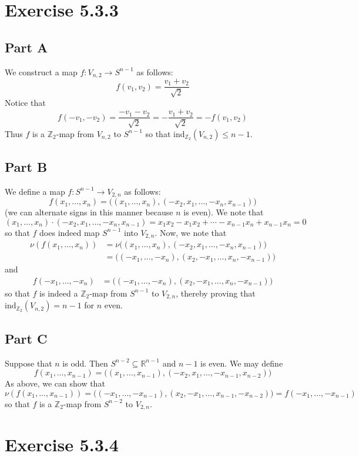 \documentclass[12pt]{article}
\newcommand{\rr}{{\mathbb R}}
\newcommand{\zz}{\mathbb Z}
\begin{document}
\section*{Exercise 5.3.3}
\subsection*{Part A}
We construct a map $f: V_{n,2} \rightarrow S^{n-1}$ as follows:
\[
f(v_1,v_2) = \frac{v_1 + v_2}{\sqrt{2}}
\] Notice that
\[
f(-v_1,-v_2) = \frac{-v_1 -v_2}{\sqrt{2}} = -\frac{v_1+v_2}{\sqrt{2}} = -f(v_1,v_2)
\] Thus $f$ is a $\zz_2$-map from $V_{n,2}$ to $S^{n-1}$ so that $\text{ind}_{\zz_2}(V_{n,2}) \leq n - 1$.
\newpage
\subsection*{Part B}
We define a map $f: S^{n-1} \rightarrow V_{2,n}$ as follows:
\[
f(x_1,\ldots,x_n) = \big((x_1,\ldots,x_n),(-x_2,x_1,\ldots,-x_n,x_{n-1})\big)
\] (we can alternate signs in this manner because $n$ is even). We note that
\[
(x_1,\ldots,x_n) \cdot (-x_2,x_1,\ldots,-x_n,x_{n-1}) = x_1x_2 - x_1x_2 + \cdots - x_{n-1}x_n + x_{n-1}x_n = 0
\] so that $f$ does indeed map $S^{n-1}$ into $V_{2,n}$. Now, we note that
\begin{align*}
\nu(f(x_1,\ldots,x_n)) &= \nu\big((x_1,\ldots,x_n),(-x_2,x_1,\ldots,-x_n,x_{n-1})\big) \\
&= \big((-x_1,\ldots,-x_n),(x_2,-x_1,\ldots,x_n,-x_{n-1})\big)
\end{align*} and
\begin{align*}
f(-x_1,\ldots,-x_n) &= \big((-x_1,\ldots,-x_n),(x_2,-x_1,\ldots,x_n,-x_{n-1})\big)
\end{align*} so that $f$ is indeed a $\zz_2$-map from $S^{n-1}$ to $V_{2,n}$, thereby proving that $\text{ind}_{\zz_2}(V_{n,2}) = n - 1$ for $n$ even.
\newpage
\subsection*{Part C}
Suppose that $n$ is odd. Then $S^{n-2} \subseteq \rr^{n-1}$ and $n-1$ is even. We may define
\[
f(x_1,\ldots,x_{n-1}) = \big((x_1,\ldots,x_{n-1}),(-x_2,x_1,\ldots,-x_{n-1},x_{n-2})\big)
\] As above, we can show that
\[
\nu(f(x_1,\ldots,x_{n-1})) = \big((-x_1,\ldots,-x_{n-1}),(x_2,-x_1,\ldots,x_{n-1},-x_{n-2})\big) = f(-x_1,\ldots,-x_{n-1})
\] so that $f$ is a $\zz_2$-map from $S^{n-2}$ to $V_{2,n}$.
\newpage
\section*{Exercise 5.3.4} 
\end{document}
